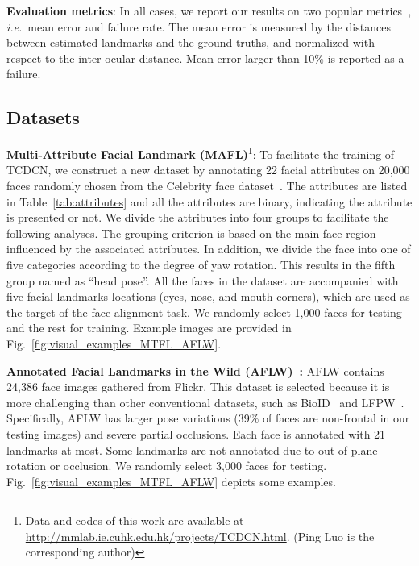 \documentclass[10pt,journal,compsoc]{IEEEtran}
\newcommand{\ie}{\emph{i.e.}~}
\begin{document}
\noindent\textbf{Evaluation metrics}:
In all cases, we report our results on two popular metrics~\cite{dollar13,Cao2012,Dantone2012,Sun2013}, \ie mean error and failure rate. The mean error is measured by the distances between estimated landmarks and the ground truths, and normalized with respect to the inter-ocular distance. Mean error larger than 10\% is reported as a failure.

\subsection{Datasets}
\label{sec:datasets}
\vspace{0.1cm}
\noindent\textbf{Multi-Attribute Facial Landmark (MAFL)}\footnote{Data and codes of this work are available at \url{http://mmlab.ie.cuhk.edu.hk/projects/TCDCN.html}. (Ping Luo is the corresponding author)}: To facilitate the training of TCDCN, we construct a new dataset by annotating 22 facial attributes on 20,000 faces randomly chosen from the Celebrity face dataset~\cite{sun2014deep}. The attributes are listed in Table~\ref{tab:attributes} and all the attributes are binary, indicating the attribute is presented or not. We divide the attributes into four groups to facilitate the following analyses. The grouping criterion is based on the main face region influenced by the associated attributes. In addition, we divide the face into one of five categories according to the degree of yaw rotation. This results in the fifth group named as ``head pose''.
All the faces in the dataset are accompanied with five facial landmarks locations (eyes, nose, and mouth corners), which are used as the target of the face alignment task. We randomly select 1,000 faces for testing and the rest for training. Example images are provided in Fig.~\ref{fig:visual_examples_MTFL_AFLW}.

\vspace{0.1cm}
\noindent\textbf{Annotated Facial Landmarks in the Wild (AFLW)~\cite{Kostinger2011}:} AFLW contains 24,386 face images gathered from Flickr. This dataset is selected because it is more challenging than other conventional datasets, such as BioID~\cite{Jesorsky} and LFPW~\cite{Belhumeur2011}. Specifically, AFLW has larger pose variations (39\% of faces are non-frontal in our testing images) and severe partial occlusions. Each face is annotated with 21 landmarks at most. Some landmarks are not annotated due to out-of-plane rotation or occlusion. We randomly select 3,000 faces for testing. Fig.~\ref{fig:visual_examples_MTFL_AFLW} depicts some examples.
\end{document}
